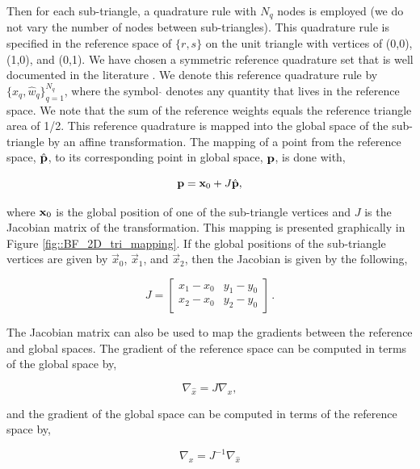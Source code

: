 \noindent Then for each sub-triangle, a quadrature rule with $N_q$ nodes is employed (we do not vary the number of nodes between sub-triangles). This quadrature rule is specified in the reference space of $\{ r, s\}$ on the unit triangle with vertices of (0,0), (1,0), and (0,1). We have chosen a symmetric reference quadrature set that is well documented in the literature \cite{dunavant1985high}. We denote this reference quadrature rule by $\Big\{ \hat{x}_q, \hat{w}_q \Big\}_{q=1}^{N_q}$, where the symbol $\hat{}$ denotes any quantity that lives in the reference space. We note that the sum of the reference weights equals the reference triangle area of 1/2. This reference quadrature is mapped into the global space of the sub-triangle by an affine transformation. The mapping of a point from the reference space, $\hat{{\bf p}}$, to its corresponding point in global space, ${\bf p}$, is done with,

\begin{equation}
\label{eq::BF_2DInt_ref_to_glob}
{\bf p} = {\bf x}_0 + J \hat{{\bf p}} ,
\end{equation}

\noindent where ${\bf x}_0$ is the global position of one of the sub-triangle vertices and $J$ is the Jacobian matrix of the transformation. This mapping is presented graphically in Figure \ref{fig::BF_2D_tri_mapping}. If the global positions of the sub-triangle vertices are given by $\vec{x}_0$, $\vec{x}_1$, and $\vec{x}_2$, then the Jacobian is given by the following, 

\begin{equation}
\label{eq::BF_2DInt_jacobian}
 J = \left[
 \begin{array}{cc}
 x_1 - x_0 & y_1 - y_0 \\
  x_2 - x_0 & y_2 - y_0
 \end{array}
 \right] \, .
\end{equation}

\noindent The Jacobian matrix can also be used to map the gradients between the reference and global spaces. The gradient of the reference space can be computed in terms of the global space by,

\begin{equation}
\label{eq::BF_2DInt_grad_ref}
\nabla_{\hat{x}} = J \nabla_{x}  ,
\end{equation}

\noindent and the gradient of the global space can be computed in terms of the reference space by,

\begin{equation}
\label{eq::BF_2DInt_grad_glob}
\nabla_{x} = J^{-1} \nabla_{\hat{x}}  
\end{equation}

